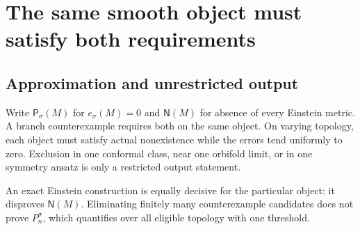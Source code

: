 \documentclass[11pt]{article}
\theoremstyle{definition}\newtheorem{problem}[theorem]{Open problem}
\theoremstyle{remark}\newtheorem{remark}[theorem]{Scope}
\numberwithin{equation}{section}
\begin{document}
\section{The same smooth object must satisfy both requirements}\label{sec:objects}
\subsection{Approximation and unrestricted output}\label{sec:same-object}
Write $\mathsf P_\sigma(M)$ for $e_\sigma(M)=0$ and $\mathsf N(M)$ for absence of every Einstein metric. A branch counterexample requires both on the same object. On varying topology, each object must satisfy actual nonexistence while the errors tend uniformly to zero. Exclusion in one conformal class, near one orbifold limit, or in one symmetry ansatz is only a restricted output statement.

An exact Einstein construction is equally decisive for the particular object: it disproves $\mathsf N(M)$. Eliminating finitely many counterexample candidates does not prove $P_n^\sigma$, which quantifies over all eligible topology with one threshold.
\end{document}
